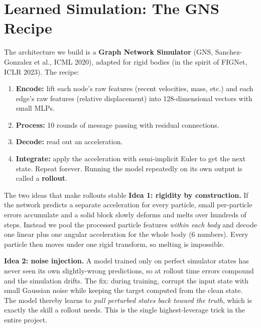 \documentclass[11pt]{article}
\begin{document}
\section{Learned Simulation: The GNS Recipe}
\label{sec:gnsbg}

The architecture we build is a \textbf{Graph Network Simulator} (GNS, Sanchez-Gonzalez et al., ICML 2020), adapted for rigid bodies (in the spirit of FIGNet, ICLR 2023). The recipe:

\begin{enumerate}[itemsep=2pt]
  \item \textbf{Encode:} lift each node's raw features (recent velocities, mass, etc.) and each edge's raw features (relative displacement) into 128-dimensional vectors with small MLPs.
  \item \textbf{Process:} 10 rounds of message passing with residual connections.
  \item \textbf{Decode:} read out an acceleration.
  \item \textbf{Integrate:} apply the acceleration with semi-implicit Euler to get the next state. Repeat forever. Running the model repeatedly on its own output is called a \textbf{rollout}.
\end{enumerate}

\begin{concept}{The two ideas that make rollouts stable}
\textbf{Idea 1: rigidity by construction.} If the network predicts a separate acceleration for every particle, small per-particle errors accumulate and a solid block slowly deforms and melts over hundreds of steps. Instead we pool the processed particle features \emph{within each body} and decode one linear plus one angular acceleration for the whole body (6 numbers). Every particle then moves under one rigid transform, so melting is impossible.

\textbf{Idea 2: noise injection.} A model trained only on perfect simulator states has never seen its own slightly-wrong predictions, so at rollout time errors compound and the simulation drifts. The fix: during training, corrupt the input state with small Gaussian noise while keeping the target computed from the clean state. The model thereby learns to \emph{pull perturbed states back toward the truth}, which is exactly the skill a rollout needs. This is the single highest-leverage trick in the entire project.
\end{concept}
\end{document}
